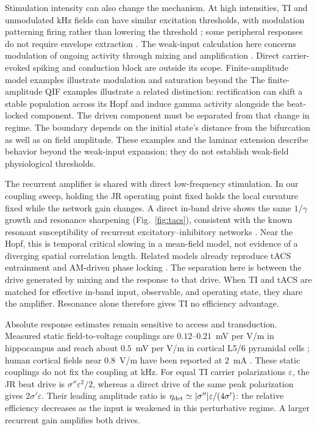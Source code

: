 \documentclass[11pt,a4paper]{article}
\newcommand{\Sig}{\sigma}
\providecommand{\DIFaddtex}[1]{{\protect\color{blue} \sf #1}} %
\providecommand{\DIFdeltex}[1]{{\protect\color{red} \scriptsize #1}} %
\providecommand{\DIFaddbegin}{} %
\providecommand{\DIFaddend}{} %
\providecommand{\DIFdelbegin}{} %
\providecommand{\DIFdelend}{} %
\providecommand{\DIFadd}[1]{\texorpdfstring{\DIFaddtex{#1}}{#1}} %
\providecommand{\DIFdel}[1]{\texorpdfstring{\DIFdeltex{#1}}{}} %
\begin{document}
Stimulation intensity can also change the mechanism. At high intensities, TI and
unmodulated kHz fields can have similar excitation thresholds, with modulation
patterning firing rather than lowering the threshold
\cite{opancar2025,semenov2025}; some peripheral responses do not require envelope
extraction \cite{peripheral2023}. The weak-input calculation here concerns
modulation of ongoing activity through mixing and amplification
\cite{vieira2024,missey2026}. Direct carrier-evoked spiking and conduction block
are outside its scope. \DIFdelbegin \DIFdel{Finite-amplitude model examples illustrate modulation and saturation beyond the }\DIFdelend \DIFaddbegin \DIFadd{The finite-amplitude QIF examples illustrate a related
distinction: rectification can shift a stable population across its Hopf and induce
gamma activity alongside the beat-locked component. The driven component must be
separated from that change in regime. The boundary depends on the initial state's
distance from the bifurcation as well as on field amplitude. These examples and the laminar extension describe
behavior beyond the weak-input }\DIFaddend expansion; they do not establish \DIFdelbegin \DIFdel{weak-field }\DIFdelend physiological thresholds.

The recurrent amplifier is shared with direct low-frequency stimulation. In our
coupling sweep, holding the JR operating point fixed holds the local curvature
fixed while the network gain changes. A direct in-band drive shows the same
$1/\gamma$ growth and resonance sharpening (Fig.~\ref{fig:tacs}), consistent with
the known resonant susceptibility of recurrent excitatory--inhibitory networks
\cite{ledoux2011,clusella2023}. Near the Hopf, this is temporal critical slowing
in a mean-field model, not evidence of a diverging spatial correlation length.
Related models already reproduce tACS entrainment and AM-driven phase locking
\cite{ali2013,negahbani2018,krause2023}. The separation here is between the drive
generated by mixing and the response to that drive. When TI and tACS are matched
for effective in-band input, observable, and operating state, they share the
amplifier. Resonance alone therefore gives TI no efficiency advantage.

Absolute response estimates remain sensitive to access and transduction.
Measured static field-to-voltage couplings are $0.12$--$0.21$~mV per V/m in
hippocampus \cite{bikson2004,deans2007} and reach about $0.5$~mV per V/m in cortical
L5/6 pyramidal cells \cite{radman2009}; human cortical fields near $0.8$~V/m have
been reported at $2$~mA \cite{huang2017,huang2017corr}. These static couplings do
not fix the coupling at kHz. For equal TI carrier polarizations $\varepsilon$,
the JR beat drive is $\Sig''\varepsilon^2/2$, whereas a direct drive of the same
peak polarization gives $2\Sig'\varepsilon$. Their leading amplitude ratio is
$\eta_{\rm det}\simeq|\Sig''|\varepsilon/(4\Sig')$: the relative efficiency decreases
as the input is weakened in this perturbative regime. A larger recurrent gain
amplifies both drives.
\end{document}
